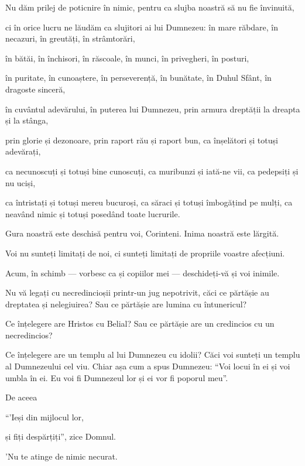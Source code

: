 {Nu dăm prilej de poticnire în nimic, pentru ca slujba noastră să nu fie învinuită,

ci în orice lucru ne lăudăm ca slujitori ai lui Dumnezeu: în mare răbdare, în necazuri, în greutăți, în strâmtorări,

în bătăi, în închisori, în răscoale, în munci, în privegheri, în posturi,

în puritate, în cunoaștere, în perseverență, în bunătate, în Duhul Sfânt, în dragoste sinceră,

în cuvântul adevărului, în puterea lui Dumnezeu, prin armura dreptății la dreapta și la stânga,

prin glorie și dezonoare, prin raport rău și raport bun, ca înșelători și totuși adevărați,

ca necunoscuți și totuși bine cunoscuți, ca muribunzi și iată-ne vii, ca pedepsiți și nu uciși,

ca întristați și totuși mereu bucuroși, ca săraci și totuși îmbogățind pe mulți, ca neavând nimic și totuși posedând toate lucrurile.


\par }{\PP {}Gura noastră este deschisă pentru voi, Corinteni. Inima noastră este lărgită.

Voi nu sunteți limitați de noi, ci sunteți limitați de propriile voastre afecțiuni.

Acum, în schimb — vorbesc ca și copiilor mei — deschideți-vă și voi inimile.


\par }{\PP {}Nu vă legați cu necredincioșii printr-un jug nepotrivit, căci ce părtășie au dreptatea și nelegiuirea? Sau ce părtășie are lumina cu întunericul?

Ce înțelegere are Hristos cu Belial? Sau ce părtășie are un credincios cu un necredincios?

Ce înțelegere are un templu al lui Dumnezeu cu idolii? Căci voi sunteți un templu al Dumnezeului cel viu. Chiar așa cum a spus Dumnezeu: “Voi locui în ei și voi umbla în ei. Eu voi fi Dumnezeul lor și ei vor fi poporul meu”.

De aceea

\par }{\Q “'Ieși din mijlocul lor,

\par }{\QB și fiți despărțiți”, zice Domnul.

\par }{\Q 'Nu te atinge de nimic necurat.

}
